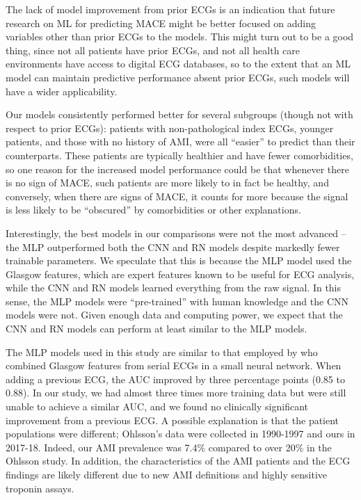 \documentclass[preprint]{elsarticle}
\begin{document}
The lack of model improvement from prior ECGs is an indication that future research on ML for predicting MACE might be better focused on adding variables other than prior ECGs to the models. This might turn out to be a good thing, since not all patients have prior ECGs, and not all health care environments have access to digital ECG databases, so to the extent that an ML model can maintain predictive performance absent prior ECGs, such models will have a wider applicability.

Our models consistently performed better for several subgroups (though not with respect to prior ECGs): patients with non-pathological index ECGs, younger patients, and those with no history of AMI, were all ``easier'' to predict than their counterparts. These patients are typically healthier and have fewer comorbidities, so one reason for the increased model performance could be that whenever there is no sign of MACE, such patients are more likely to in fact be healthy, and conversely, when there are signs of MACE, it counts for more because the signal is less likely to be ``obscured'' by comorbidities or other explanations.

Interestingly, the best models in our comparisons were not the most advanced – the MLP outperformed both the CNN and RN models despite markedly fewer trainable parameters. We speculate that this is because the MLP model used the Glasgow features, which are expert features known to be useful for ECG analysis, while the CNN and RN models learned everything from the raw signal. In this sense, the MLP models were ``pre-trained'' with human knowledge and the CNN models were not. Given enough data and computing power, we expect that the CNN and RN models can perform at least similar to the MLP models.

The MLP models used in this study are similar to that employed by \citet{ohlsson2001} who combined Glasgow features from serial ECGs in a small neural network. When adding a previous ECG, the AUC improved by three percentage points (0.85 to 0.88). In our study, we had almost three times more training data but were still unable to achieve a similar AUC, and we found no clinically significant improvement from a previous ECG. A possible explanation is that the patient populations were different; Ohlsson's data were collected in 1990-1997 and ours in 2017-18. Indeed, our AMI prevalence was 7.4\% compared to over 20\% in the Ohlsson study. In addition, the characteristics of the AMI patients and the ECG findings are likely different due to new AMI definitions and highly sensitive troponin assays. 
\end{document}
